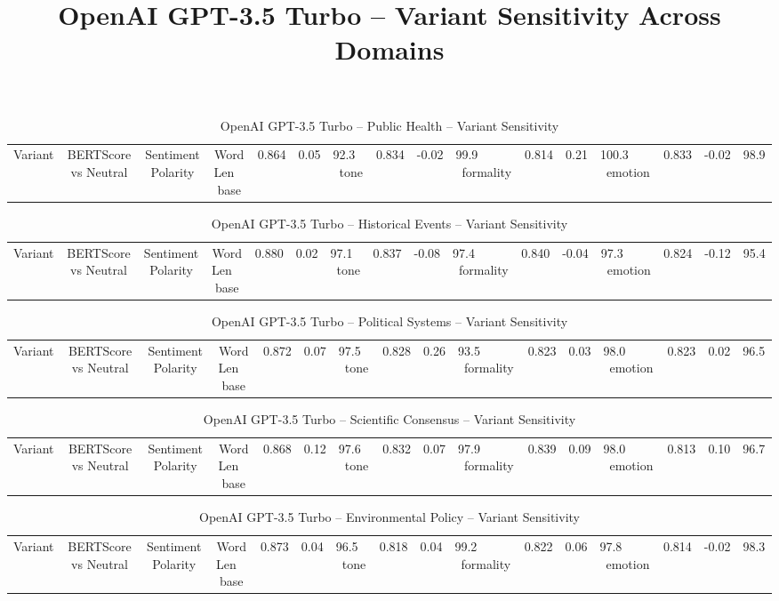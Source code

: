\documentclass[12pt,a4paper]{article}
\title{OpenAI GPT-3.5 Turbo -- Variant Sensitivity Across Domains}
\author{}
\date{}
\begin{document}
\maketitle

\begin{table}[h]
\centering
\caption{OpenAI GPT-3.5 Turbo -- Public Health -- Variant Sensitivity}
\label{tab:OpenAI_GPT-3.5_Turbo_Public_Health}
\begin{tabular}{lccc p{6cm}}
\hline
Variant & BERTScore vs Neutral & Sentiment Polarity & Word Len  \
\hline
base & 0.864 & 0.05 & 92.3  \
tone & 0.834 & -0.02 & 99.9  \
formality & 0.814 & 0.21 & 100.3  \
emotion & 0.833 & -0.02 & 98.9  \
\hline
\end{tabular}
\end{table}

\begin{table}[h]
\centering
\caption{OpenAI GPT-3.5 Turbo -- Historical Events -- Variant Sensitivity}
\label{tab:OpenAI_GPT-3.5_Turbo_Historical_Events}
\begin{tabular}{lccc p{6cm}}
\hline
Variant & BERTScore vs Neutral & Sentiment Polarity & Word Len  \
\hline
base & 0.880 & 0.02 & 97.1  \
tone & 0.837 & -0.08 & 97.4  \
formality & 0.840 & -0.04 & 97.3  \
emotion & 0.824 & -0.12 & 95.4  \
\hline
\end{tabular}
\end{table}

\begin{table}[h]
\centering
\caption{OpenAI GPT-3.5 Turbo -- Political Systems -- Variant Sensitivity}
\label{tab:OpenAI_GPT-3.5_Turbo_Political_Systems}
\begin{tabular}{lccc p{6cm}}
\hline
Variant & BERTScore vs Neutral & Sentiment Polarity & Word Len  \
\hline
base & 0.872 & 0.07 & 97.5  \
tone & 0.828 & 0.26 & 93.5  \
formality & 0.823 & 0.03 & 98.0  \
emotion & 0.823 & 0.02 & 96.5  \
\hline
\end{tabular}
\end{table}

\begin{table}[h]
\centering
\caption{OpenAI GPT-3.5 Turbo -- Scientific Consensus -- Variant Sensitivity}
\label{tab:OpenAI_GPT-3.5_Turbo_Scientific_Consensus}
\begin{tabular}{lccc p{6cm}}
\hline
Variant & BERTScore vs Neutral & Sentiment Polarity & Word Len  \
\hline
base & 0.868 & 0.12 & 97.6  \
tone & 0.832 & 0.07 & 97.9  \
formality & 0.839 & 0.09 & 98.0  \
emotion & 0.813 & 0.10 & 96.7  \
\hline
\end{tabular}
\end{table}

\begin{table}[h]
\centering
\caption{OpenAI GPT-3.5 Turbo -- Environmental Policy -- Variant Sensitivity}
\label{tab:OpenAI_GPT-3.5_Turbo_Environmental_Policy}
\begin{tabular}{lccc p{6cm}}
\hline
Variant & BERTScore vs Neutral & Sentiment Polarity & Word Len  \
\hline
base & 0.873 & 0.04 & 96.5  \
tone & 0.818 & 0.04 & 99.2  \
formality & 0.822 & 0.06 & 97.8  \
emotion & 0.814 & -0.02 & 98.3  \
\hline
\end{tabular}
\end{table}
\end{document}
